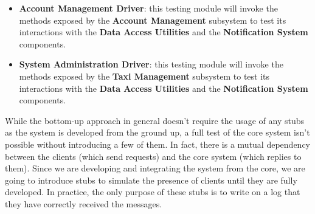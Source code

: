 \begin{itemize}
	\item \textbf{Account Management Driver}: this testing module will invoke the methods exposed by the \textbf{Account Management} subsystem to test its interactions with the \textbf{Data Access Utilities} and the \textbf{Notification System} components. 
	\item \textbf{System Administration Driver}: this testing module will invoke the methods exposed by the \textbf{Taxi Management} subsystem to test its interactions with the \textbf{Data Access Utilities} and the \textbf{Notification System} components. 
\end{itemize}


While the bottom-up approach in general doesn't require the usage of any stubs as the system is developed from the ground up, a full test of the core system isn't possible without introducing a few of them. In fact, there is a mutual dependency between the clients (which send requests) and the core system (which replies to them). Since we are developing and integrating the system from the core, we are going to introduce stubs to simulate the presence of clients until they are fully developed. In practice, the only purpose of these stubs is to write on a log that they have correctly received the messages.


